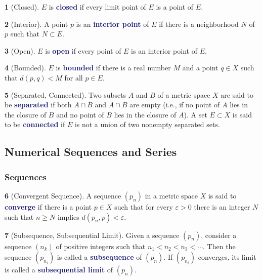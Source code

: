 \documentclass[12pt]{article}
\numberwithin{equation}{section}
\newcommand{\navy}[1]{\textcolor{MidnightBlue}{\bf #1}}
\theoremstyle{plain}
\theoremstyle{definition}
\newtheorem{definition}{\color{MidnightBlue}{\textbf{Definition}}}[section]
\newcommand{\1}{\mathbbm 1}
\newcommand{\e}{\varepsilon}
\begin{document}
\begin{definition}[Closed]
	$E$ is \navy{closed} if every limit point of $E$ is a point of $E$.
\end{definition}

\begin{definition}[Interior]
	A point $p$ is an \navy{interior point} of $E$ if there is a neighborhood $N$ of $p$ such that $N \subset E$.
\end{definition}

\begin{definition}[Open]
	$E$ is \navy{open} if every point of $E$ is an interior point of $E$.
\end{definition}

\begin{definition}[Bounded]
	$E$ is \navy{bounded} if there is a real number $M$ and a point $q \in X$ such that $d(p,q) < M$ for all $p \in E$.
\end{definition}

\begin{definition}[Separated, Connected]
	Two subsets $A$ and $B$ of a metric space $X$ are said to be \navy{separated} if both $A \cap \bar{B}$ and $\bar{A} \cap B$ are empty (i.e., if no point of $A$ lies in the closure of $B$ and no point of $B$ lies in the closure of $A$). A set $E \subset X$ is said to be \navy{connected} if $E$ is not a union of two nonempty separated sets. 
\end{definition}

\subsection{Numerical Sequences and Series}

\subsubsection{Sequences}

\begin{definition}[Convergent Sequence]
	A sequence $(p_n)$ in a metric space $X$ is said to \navy{converge} if there is a point $p \in X$ such that for every $\e > 0$ there is an integer $N$ such that $n \geq N$ implies $d(p_n,p) < \e$. 
\end{definition}

\begin{definition}[Subsequence, Subsequential Limit]
	Given a sequence $(p_n)$, consider a sequence $(n_k)$ of positive integers such that $n_1 < n_2 < n_3 < \cdots $. Then the sequence $(p_{n_i})$ is called a \navy{subsequence} of $(p_n)$. If $(p_{n_i})$ converges, its limit is called a \navy{subsequential limit} of $(p_n)$.
\end{definition}
\end{document}
